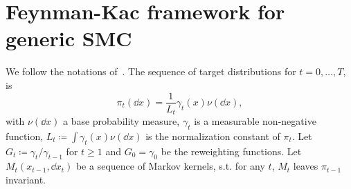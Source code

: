 \section{Feynman-Kac framework for generic SMC}
We follow the notations of~\citep{dau:hal-04273259}.
The sequence of target distributions for $t=0, \ldots, T$, is
\begin{equation}
    \pi_t(\dd x) = \frac{1}{L_t}\gamma_t(x)\nu(\dd x),
\end{equation}
with $\nu(\dd x)$ a base probability measure, $\gamma_t$ is a measurable non-negative function, $L_t\coloneq \int \gamma_t(x)\nu(\dd x)$ is the normalization constant of $\pi_t$.
Let $G_t \coloneq \gamma_t /\gamma_{t-1}$ for $t\geq 1$ and $G_0 = \gamma_0$ be the reweighting functions. Let $M_t(x_{t-1},\dd x_t)$ be a sequence of Markov kernels, s.t. for any $t$, $M_t$ leaves $\pi_{t-1}$ invariant.
